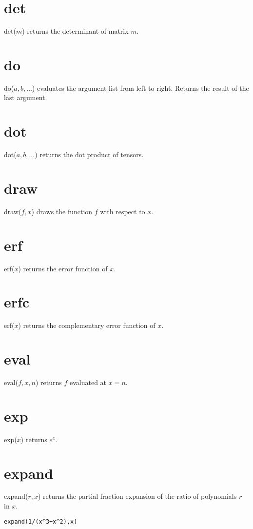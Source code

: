 \section*{det}
det($m$) returns the determinant of matrix $m$.

\section*{do}
do($a,b,\ldots$) evaluates the argument list from left to right.
Returns the result of the last argument.

\section*{dot}
dot($a,b,\ldots$) returns the dot product of tensors.

\section*{draw}
draw($f,x$) draws the function $f$ with respect to $x$.

\section*{erf}
erf($x$) returns the error function of $x$.

\section*{erfc}
erf($x$) returns the complementary error function of $x$.

\section*{eval}
eval($f,x,n$) returns $f$ evaluated at $x=n$.

\section*{exp}
exp($x$) returns $e^x$.

\section*{expand}
expand($r,x$) returns the partial fraction expansion of the ratio of
polynomials $r$ in $x$.

\begin{Verbatim}[formatcom=\color{blue},samepage=true]
expand(1/(x^3+x^2),x)
\end{Verbatim}

